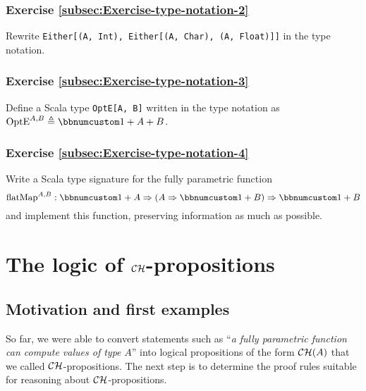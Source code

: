 \subsubsection{Exercise \label{subsec:Exercise-type-notation-2}\ref{subsec:Exercise-type-notation-2}}

Rewrite \lstinline!Either[(A, Int), Either[(A, Char), (A, Float)]]!
in the type notation.

\subsubsection{Exercise \label{subsec:Exercise-type-notation-3}\ref{subsec:Exercise-type-notation-3}}

Define a Scala type \lstinline!OptE[A, B]! written in the type notation
as $\text{OptE}^{A,B}\triangleq\bbnum 1+A+B$.

\subsubsection{Exercise \label{subsec:Exercise-type-notation-4}\ref{subsec:Exercise-type-notation-4}}

Write a Scala type signature for the fully parametric function 
\[
\text{flatMap}^{A,B}:\bbnum 1+A\Rightarrow\left(A\Rightarrow\bbnum 1+B\right)\Rightarrow\bbnum 1+B
\]
and implement this function, preserving information as much as possible.

\section{The logic of ${\cal CH}$-propositions}

\subsection{Motivation and first examples\label{subsec:ch-Motivation-and-first-examples}}

So far, we were able to convert statements such as ``\emph{a fully
parametric function can compute values of type} $A$'' into logical
propositions of the form ${\cal CH}(A)$ that we called ${\cal CH}$-propositions.
The next step is to determine the proof rules suitable for reasoning
about ${\cal CH}$-propositions.


